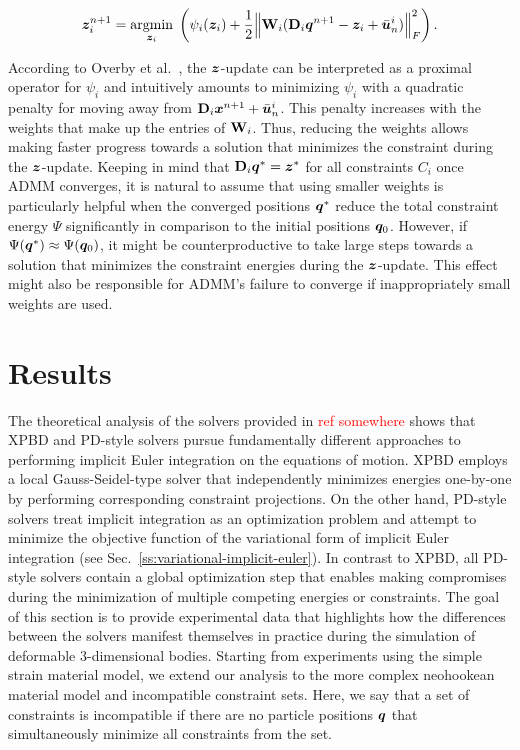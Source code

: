 \begin{equation}\label{eq:admm-z-update-copy}
    \bm{z}_i^{n+1} = \underset{\bm{z}_i}{\operatorname{argmin}}\; \left (\psi_i(\bm{z}_i) + \frac{1}{2}\norm{\mathbf{W}_i(\mathbf{D}_i\bm{q}^{n+1} - \bm{z}_i + \bar{\bm{u}}^i_n)}^2_F \right ).
\end{equation}

\noindent According to Overby et al.\ \cite{overby2017}, the $\bm{z}$-update can be interpreted as a proximal operator for $\psi_i$ and intuitively amounts to 
minimizing $\psi_i$ with a quadratic penalty for moving away from $\mathbf{D}_i\bm{x}^{n+1}+ \bar{\bm{u}}^i_n$. This penalty increases with the weights that make 
up the entries of $\mathbf{W}_i$. Thus, reducing the weights allows making faster progress towards a solution that minimizes the constraint during 
the $\bm{z}$-update. Keeping in mind that $\mathbf{D}_i\bm{q}^* = \bm{z}^*$ for all constraints $C_i$ once ADMM converges, it is natural to assume that using smaller
weights is particularly helpful when the converged positions $\bm{q}^*$ reduce the total constraint energy $\Psi$ significantly in comparison to the initial positions 
$\bm{q}_0$. However, if $\Psi(\bm{q}^*) \approx \Psi(\bm{q}_0)$, it might be counterproductive to take large steps towards a solution that minimizes the constraint 
energies during the $\bm{z}$-update. This effect might also be responsible for ADMM's failure to converge if inappropriately small weights are used.

\section{Results}
The theoretical analysis of the solvers provided in \textcolor{red}{ref somewhere} shows that XPBD and PD-style solvers pursue fundamentally different approaches to 
performing implicit Euler integration on the equations of motion. XPBD employs a local Gauss-Seidel-type solver that independently minimizes energies one-by-one by 
performing corresponding constraint projections. On the other hand, PD-style solvers treat implicit integration as an 
optimization problem and attempt to minimize the objective function of the variational form of implicit Euler integration (see Sec.\ \ref{ss:variational-implicit-euler}). 
In contrast to XPBD, all PD-style solvers contain a global optimization step that enables making compromises during the minimization of multiple 
competing energies or constraints. The goal of this section is to provide experimental data that highlights how the differences between the solvers manifest themselves 
in practice during the simulation of deformable 3-dimensional bodies. Starting from experiments using the simple strain material model, we extend our analysis to the more 
complex neohookean material model and incompatible constraint sets. Here, we say that a set of constraints is incompatible if there are no particle positions 
$\bm{q}$ that simultaneously minimize all constraints from the set.

